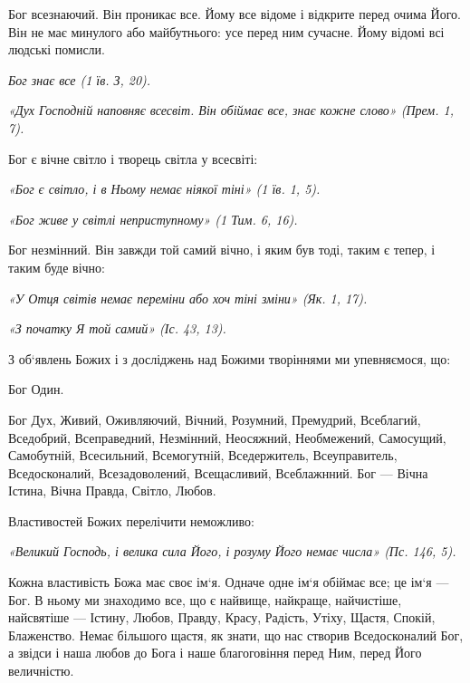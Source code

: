 \documentclass[main.tex]{subfiles}
\begin{document}
Бог всезнаючий. Він проникає все. Йому все відоме і відкрите перед очима Його. Він не має минулого або майбутнього: усе перед ним сучасне. Йому відомі всі людські помисли.

\emph{Бог знає все (1 їв. З, 20).}

\begin{FlushRight}
    \emph{«Дух Господній наповняє всесвіт. Він обіймає все, знає кожне слово» (Прем. 1, 7).}
\end{FlushRight}


Бог є вічне світло і творець світла у всесвіті:

\begin{FlushRight}
    \emph{«Бог є світло, і в Ньому немає ніякої тіні» (1 їв. 1, 5).}
\end{FlushRight}

\begin{FlushRight}
    \emph{«Бог живе у світлі неприступному» (1 Тим. 6, 16).}
\end{FlushRight}


Бог незмінний. Він завжди той самий вічно, і яким був тоді, таким є тепер, і таким буде вічно:

\begin{FlushRight}
    \emph{«У Отця світів немає переміни або хоч тіні зміни» (Як. 1, 17).}
\end{FlushRight}

\begin{FlushRight}
    \emph{{\color{red}«З початку Я той самий»} (Іс. 43, 13).}
\end{FlushRight}


З об`явлень Божих і з досліджень над Божими творіннями ми упевняємося, що:

Бог Один.

Бог Дух, Живий, Оживляючий, Вічний, Розумний, Премудрий, Всеблагий, Вседобрий, Всеправедний, Незмінний, Неосяжний, Необмежений, Самосущий, Самобутній, Всесильний, Всемогутній, Вседержитель, Всеуправитель, Вседосконалий, Всезадоволений, Всещасливий, Всеблажнний. Бог — Вічна Істина, Вічна Правда, Світло, Любов.

Властивостей Божих перелічити неможливо:

\begin{FlushRight}
    \emph{«Великий Господь, і велика сила Його, і розуму Його немає числа» (Пс. 146, 5).}
\end{FlushRight}


Кожна властивість Божа має своє ім`я. Одначе одне ім`я обіймає все; це ім`я — Бог. В ньому ми знаходимо все, що є найвище, найкраще, найчистіше, найсвятіше — Істину, Любов, Правду, Красу, Радість, Утіху, Щастя, Спокій, Блаженство. Немає більшого щастя, як знати, що нас створив Вседосконалий Бог, а звідси і наша любов до Бога і наше благоговіння перед Ним, перед Його величністю.
\end{document}
